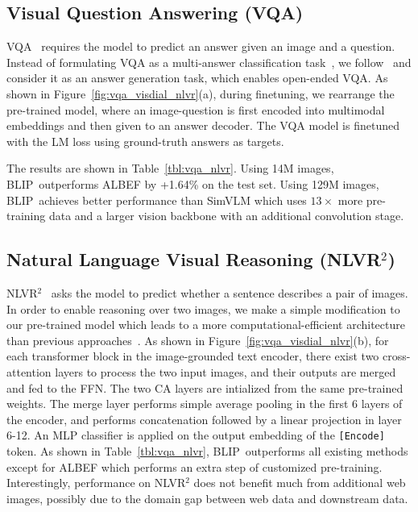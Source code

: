 \subsection{Visual Question Answering (VQA)}

VQA~\cite{VQA} requires the model to predict an answer given an image and a question. Instead of formulating VQA as a multi-answer classification task~\cite{uniter,oscar}, we follow~\citet{ALBEF} and consider it as an answer generation task, which enables open-ended VQA. As shown in Figure~\ref{fig:vqa_visdial_nlvr}(a),
during finetuning, we rearrange the pre-trained model, where an image-question is first encoded into multimodal embeddings and then given to an answer decoder. The VQA model is finetuned with the LM loss using ground-truth answers as targets.

The results are shown in Table~\ref{tbl:vqa_nlvr}.
Using 14M images, BLIP~outperforms ALBEF by +1.64\% on the test set. Using 129M images, BLIP~achieves better performance than SimVLM which uses $13\times$ more pre-training data and a larger vision backbone with an additional convolution stage.

\subsection{Natural Language Visual Reasoning (NLVR$^2$)}

NLVR$^2$~\cite{NLVR} asks the model to predict whether a sentence describes a pair of images. In order to enable reasoning over two images, we make a simple modification to our pre-trained model which leads to a more computational-efficient architecture than previous approaches~\cite{ALBEF,simvlm}. As shown in Figure~\ref{fig:vqa_visdial_nlvr}(b),
for each transformer block in the image-grounded text encoder, there exist two cross-attention layers to process the two input images, and their outputs are merged and fed to the FFN. The two CA layers are intialized from the same pre-trained weights. The merge layer performs simple average pooling in the first 6 layers of the encoder, and performs concatenation followed by a linear projection in layer 6-12. An MLP classifier is applied on the output embedding of the \texttt{[Encode]} token. As shown in Table~\ref{tbl:vqa_nlvr},
BLIP~outperforms all existing methods except for ALBEF which performs an extra step of customized pre-training. Interestingly, performance on NLVR$^2$ does not benefit much from additional web images, possibly due to the domain gap between web data and downstream data.

